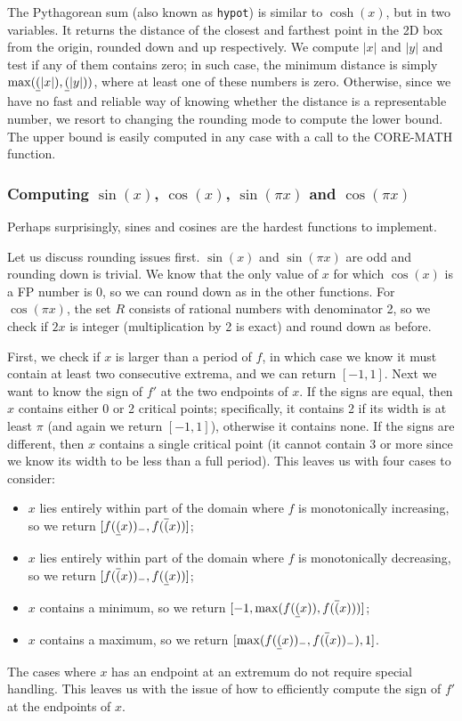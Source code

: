 The Pythagorean sum (also known as \texttt{hypot}) is similar to $\cosh(x)$, but in two variables. It returns the distance of the closest and farthest point in the 2D box from the origin, rounded down and up respectively.
We compute $|x|$ and $|y|$ and test if any of them contains zero; in such case, the minimum distance is simply $\max(\underline{(}|x|), \underline{(}|y|))$, where at least one of these numbers is zero.
Otherwise, since we have no fast and reliable way of knowing whether the distance is a representable number, we resort to changing the rounding mode to compute the lower bound.
The upper bound is easily computed in any case with a call to the CORE-MATH function.

\subsubsection{Computing $\sin(x)$, $\cos(x)$, $\sin(\pi x)$ and $\cos(\pi x)$}
Perhaps surprisingly, sines and cosines are the hardest functions to implement.

Let us discuss rounding issues first. $\sin(x)$ and $\sin(\pi x)$ are odd and rounding down is trivial.
We know that the only value of $x$ for which $\cos(x)$ is a FP number is $0$, so we can round down as in the other functions. For $\cos(\pi x)$, the set $R$ consists of rational numbers with denominator 2, so we check if $2x$ is integer (multiplication by 2 is exact) and round down as before.

First, we check if $x$ is larger than a period of $f$, in which case we know it must contain at least two consecutive extrema, and we can return $[-1,1]$.
Next we want to know the sign of $f'$ at the two endpoints of $x$.
If the signs are equal, then $x$ contains either 0 or 2 critical points; specifically, it contains 2 if its width is at least $\pi$ (and again we return $[-1,1]$), otherwise it contains none.
If the signs are different, then $x$ contains a single critical point (it cannot contain 3 or more since we know its width to be less than a full period).
This leaves us with four cases to consider:
\begin{itemize}
	\item $x$ lies entirely within part of the domain where $f$ is monotonically increasing, so we return $[f(\underline{(}x))_-, f(\overline{(}x))]$;
	\item $x$ lies entirely within part of the domain where $f$ is monotonically decreasing, so we return $[f(\overline{(}x))_-, f(\underline{(}x))]$;
	\item $x$ contains a minimum, so we return $[-1, \max(f(\underline{(}x)), f(\overline{(}x)))]$;
	\item $x$ contains a maximum, so we return $[\max(f(\underline{(}x))_-, f(\overline{(}x))_-), 1]$.
\end{itemize}
The cases where $x$ has an endpoint at an extremum do not require special handling.
This leaves us with the issue of how to efficiently compute the sign of $f'$ at the endpoints of $x$.

